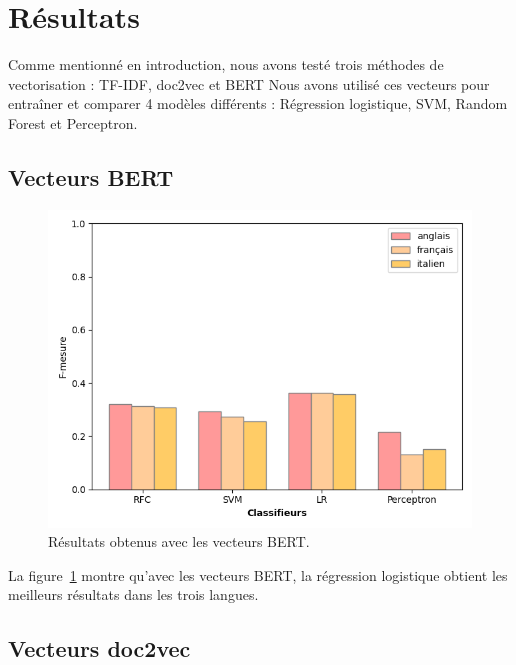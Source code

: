 \section{Résultats}

Comme mentionné en introduction, nous avons testé trois méthodes de vectorisation : TF-IDF, doc2vec et BERT
Nous avons utilisé ces vecteurs pour entraîner et comparer 4 modèles différents : Régression logistique, SVM, Random Forest et Perceptron.

\subsection{Vecteurs BERT}

\begin{figure}[t]
  \includegraphics[width=\columnwidth]{assets/comparaison_metriques_bert.png}
  \caption{Résultats obtenus avec les vecteurs BERT.}
  \label{fig:bert_comparison}
\end{figure}

La figure~\ref{fig:bert_comparison} montre qu'avec les vecteurs BERT, la régression logistique obtient les meilleurs résultats dans les trois langues.

\subsection{Vecteurs doc2vec}

